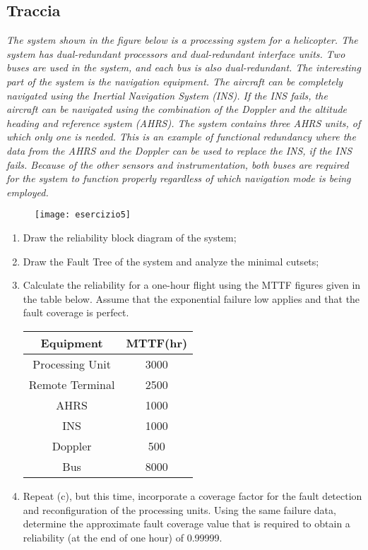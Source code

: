 \subsection{Traccia}
\textit{The system shown in the figure below is a processing system for a helicopter. The system
has dual-redundant processors and dual-redundant interface units. Two buses are used in
the system, and each bus is also dual-redundant. The interesting part of the system is the
navigation equipment. The aircraft can be completely navigated using the Inertial
Navigation System (INS). If the INS fails, the aircraft can be navigated using the
combination of the Doppler and the altitude heading and reference system (AHRS). The
system contains three AHRS units, of which only one is needed. This is an example of
functional redundancy where the data from the AHRS and the Doppler can be used to
replace the INS, if the INS fails. Because of the other sensors and instrumentation, both
buses are required for the system to function properly regardless of which navigation mode
is being employed.}

\begin{figure}[!htbp]
  \centering
  \texttt{[image: esercizio5]}
  \label{dep_esericizo5}
\end{figure}

\begin{enumerate}
  \item Draw the reliability block diagram of the system;
  \item Draw the Fault Tree of the system and analyze the minimal cutsets;
  \item Calculate the reliability for a one-hour flight using the MTTF figures given in the table
  below. Assume that the exponential failure low applies and that the fault coverage is perfect.

  \begin{center}
  \begin{tabular}{|c|c|}
  	\hline
  	\textbf{Equipment} & \textbf{MTTF(hr)} \\
  	\hline
  	Processing Unit  & 3000 \\
  	\hline
  	Remote Terminal  & 2500 \\
  	\hline
  	AHRS & 1000 \\
  	\hline
  	INS & 1000 \\
  	\hline
  	Doppler & 500 \\
  	\hline
  	Bus & 8000 \\
  	\hline
  \end{tabular}
  \end{center}

  \item Repeat (c), but this time, incorporate a coverage factor for the fault
  detection and reconfiguration of the processing units. Using the same failure
  data, determine the approximate fault coverage value that is required to obtain
  a reliability (at the end of one hour) of 0.99999.
\end{enumerate}

